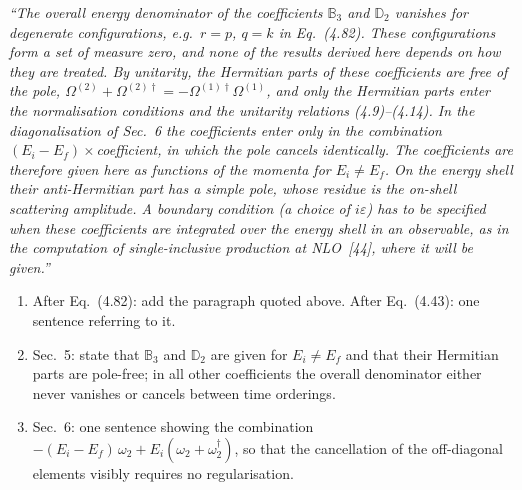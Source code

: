 \documentclass[11pt,a4paper]{article}
\begin{document}
\begin{changes}
\textit{``The overall energy denominator of the coefficients $\mathbb B_3$ and $\mathbb D_2$ vanishes for degenerate configurations, e.g.\ $r=p$, $q=k$ in Eq.~(4.82). These configurations form a set of measure zero, and none of the results derived here depends on how they are treated. By unitarity, the Hermitian parts of these coefficients are free of the pole, $\Omega^{(2)}+\Omega^{(2)\dagger}=-\Omega^{(1)\dagger}\Omega^{(1)}$, and only the Hermitian parts enter the normalisation conditions and the unitarity relations (4.9)--(4.14). In the diagonalisation of Sec.~6 the coefficients enter only in the combination $(E_i-E_f)\times$coefficient, in which the pole cancels identically. The coefficients are therefore given here as functions of the momenta for $E_i\neq E_f$. On the energy shell their anti-Hermitian part has a simple pole, whose residue is the on-shell scattering amplitude. A boundary condition (a choice of $i\varepsilon$) has to be specified when these coefficients are integrated over the energy shell in an observable, as in the computation of single-inclusive production at NLO~[44], where it will be given.''}
\end{changes}

\begin{changes}
\begin{enumerate}[leftmargin=16pt,itemsep=2pt]
\item After Eq.~(4.82): add the paragraph quoted above. After Eq.~(4.43): one sentence referring to it.
\item Sec.~5: state that $\mathbb B_3$ and $\mathbb D_2$ are given for $E_i\neq E_f$ and that their Hermitian parts are pole-free; in all other coefficients the overall denominator either never vanishes or cancels between time orderings.
\item Sec.~6: one sentence showing the combination $-(E_i-E_f)\,\omega_2+E_i(\omega_2+\omega_2^\dagger)$, so that the cancellation of the off-diagonal elements visibly requires no regularisation.
\end{enumerate}
\end{changes}
\end{document}
